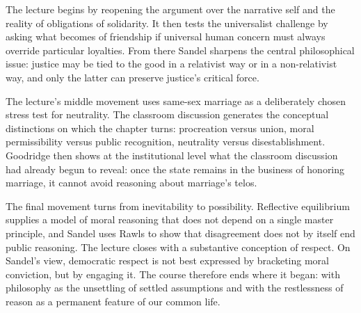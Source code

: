 The lecture begins by reopening the argument over the narrative self and the reality of obligations of solidarity. It then tests the universalist challenge by asking what becomes of friendship if universal human concern must always override particular loyalties. From there Sandel sharpens the central philosophical issue: justice may be tied to the good in a relativist way or in a non-relativist way, and only the latter can preserve justice's critical force.

The lecture's middle movement uses same-sex marriage as a deliberately chosen stress test for neutrality. The classroom discussion generates the conceptual distinctions on which the chapter turns: procreation versus union, moral permissibility versus public recognition, neutrality versus disestablishment. Goodridge then shows at the institutional level what the classroom discussion had already begun to reveal: once the state remains in the business of honoring marriage, it cannot avoid reasoning about marriage's telos.

The final movement turns from inevitability to possibility. Reflective equilibrium supplies a model of moral reasoning that does not depend on a single master principle, and Sandel uses Rawls to show that disagreement does not by itself end public reasoning. The lecture closes with a substantive conception of respect. On Sandel's view, democratic respect is not best expressed by bracketing moral conviction, but by engaging it. The course therefore ends where it began: with philosophy as the unsettling of settled assumptions and with the restlessness of reason as a permanent feature of our common life.